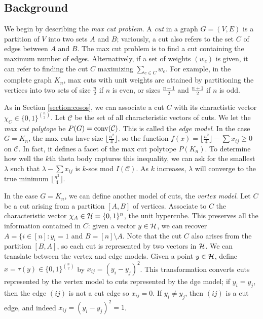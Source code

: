 \subsection{Background}
We begin by describing the {\em max cut problem}.
A {\em cut} in a graph $G=(V,E)$ is a partition of $V$ into two sets $A$ and $B$; variously, a cut also refers to the set $C$ of edges between $A$ and $B$.
The max cut problem is to find a cut containing the maximum number of edges.
Alternatively, if a set of weights $(w_e)$ is given, it can refer to finding the cut $C$ maximizing $\sum_{e \in C} w_e$.
For example, in the complete graph $K_n$, max cuts with unit weights are attained by partitioning the vertices into two sets of size $\frac{n}{2}$ if $n$ is even, or sizes $\frac{n-1}{2}$ and $\frac{n+1}{2}$ if $n$ is odd.

As in Section \ref{section:cosos}, we can associate a cut $C$ with its charactistic vector $\chi_C \in \{0,1\}^{n \choose 2}$.
Let $\mathcal{C}$ be the set of all characteristic vectors of cuts.
We let the {\em max cut polytope} be $P(G) = \hbox{conv} (\mathcal{C})$.
This is called the {\em edge model}.
In the case $G = K_n$, the max cuts have size $\lfloor \frac{n^2}{4} \rfloor$, so the function $f(x) = \lfloor \frac{n^2}{4} \rfloor - \sum x_{ij} \ge 0$ on $\mathcal{C}$.
In fact, it defines a facet of the max cut polytope $P(K_n)$.
To determine how well the $k$th theta body captures this inequality, we can ask for the smallest $\lambda$ such that $\lambda - \sum x_{ij}$ is $k$-sos mod $I(\mathcal{C})$.
As $k$ increases, $\lambda$ will converge to the true minimum $\lfloor \frac{n^2}{4} \rfloor$.

In the case $G = K_n$, we can define another model of cuts, the {\em vertex model}. 
Let $C$ be a cut arising from a partition $[A,B]$ of vertices.
Associate to $C$ the characteristic vector $\chi_A \in \mathcal{H} = \{0,1\}^n$, the unit hypercube.
This preserves all the information contained in $C$: given a vector $y \in \mathcal{H}$, we can recover $A = \{i \in [n]: y_i = 1$ and $B = [n] \setminus A$.
Note that the cut $C$ also arises from the partition $[B,A]$, so each cut is represented by two vectors in $\mathcal{H}$.
We can translate between the vertex and edge models.
Given a point $y \in \mathcal{H}$, define $x = \tau(y)\in \{0,1\}^{n \choose 2}$ by $x_{ij} = (y_i - y_j)^2$.
This transformation converts cuts represented by the vertex model to cuts represented by the dge model; if $y_i = y_j$, then the edge $(ij)$ is not a cut edge so $x_{ij}=0$.
If $y_i \ne y_j$, then $(ij)$ is a cut edge, and indeed $x_{ij} = (y_i-y_j)^2 = 1$.

